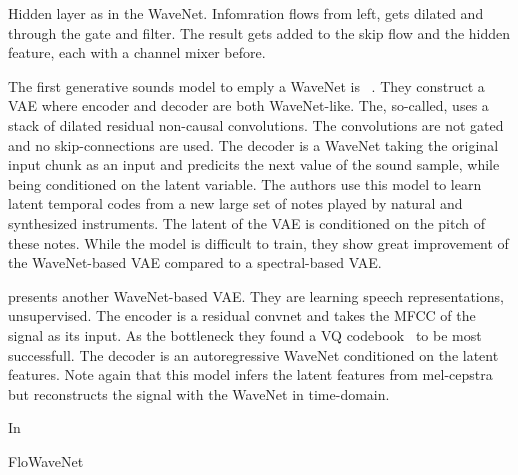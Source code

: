 \begin{marginfigure}
    
    \caption{Hidden layer as in the WaveNet. Infomration flows from left, gets dilated and through the gate and filter. The result gets added to the skip flow and the hidden feature, each with a channel mixer before.}%
    \label{fig:wavenet_layer}
\end{marginfigure}


The first generative sounds model to emply a WaveNet is ~\cite{kalchbrennerEfficient2018}. They construct a VAE where encoder and decoder are both WaveNet-like. The, so-called,  uses a stack of dilated residual non-causal convolutions. The convolutions are not gated and no skip-connections are used. The decoder is a WaveNet taking the original input chunk as an input and predicits the next value of the sound sample, while being conditioned on the latent variable. The authors use this model to learn latent temporal codes from a new large set of notes played by natural and synthesized instruments. The latent of the VAE is conditioned on the pitch of these notes. While the model is difficult to train, they show great improvement of the WaveNet-based VAE compared to a spectral-based VAE.

\textcite{chorowskiUnsupervised2019} presents another WaveNet-based VAE. They are learning speech representations, unsupervised. The encoder is a residual convnet and takes the MFCC of the signal as its input. As the bottleneck they found a VQ codebook~\cite{vandenoordNeural2017} to be most successfull. The decoder is an autoregressive WaveNet conditioned on the latent features. Note again that this model infers the latent features from mel-cepstra but reconstructs the signal with the WaveNet in time-domain.

In~\cite{prengerWaveGlow2018}

FloWaveNet~\cite{kimFloWaveNet2019a}
